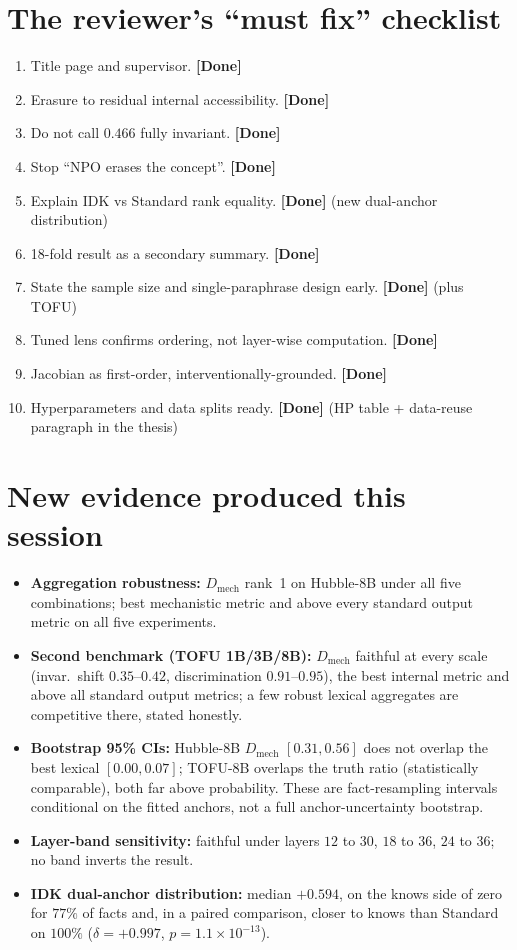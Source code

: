 \documentclass[11pt,a4paper]{article}
\newcommand{\dmech}{\ensuremath{D_{\text{mech}}}}
\newcommand{\done}{\textbf{\textcolor{black!80}{[Done]}}}
\begin{document}
\section{The reviewer's ``must fix'' checklist}
\begin{enumerate}[label=\arabic*.]
\item Title page and supervisor. \done{}
\item Erasure to residual internal accessibility. \done{}
\item Do not call $0.466$ fully invariant. \done{}
\item Stop ``NPO erases the concept''. \done{}
\item Explain IDK vs Standard rank equality. \done{} (new dual-anchor distribution)
\item 18-fold result as a secondary summary. \done{}
\item State the sample size and single-paraphrase design early. \done{} (plus TOFU)
\item Tuned lens confirms ordering, not layer-wise computation. \done{}
\item Jacobian as first-order, interventionally-grounded. \done{}
\item Hyperparameters and data splits ready. \done{} (HP table + data-reuse paragraph in the thesis)
\end{enumerate}

\section{New evidence produced this session}
\begin{itemize}
\item \textbf{Aggregation robustness:} \dmech{} rank~1 on Hubble-8B under all five combinations; best
mechanistic metric and above every standard output metric on all five experiments.
\item \textbf{Second benchmark (TOFU 1B/3B/8B):} \dmech{} faithful at every scale (invar.\ shift
$0.35$--$0.42$, discrimination $0.91$--$0.95$), the best internal metric and above all standard output
metrics; a few robust lexical aggregates are competitive there, stated honestly.
\item \textbf{Bootstrap 95\% CIs:} Hubble-8B \dmech{} $[0.31,0.56]$ does not overlap the best lexical
$[0.00,0.07]$; TOFU-8B overlaps the truth ratio (statistically comparable), both far above probability.
These are fact-resampling intervals conditional on the fitted anchors, not a full anchor-uncertainty
bootstrap.
\item \textbf{Layer-band sensitivity:} faithful under layers $12$ to $30$, $18$ to $36$, $24$ to $36$; no
band inverts the result.
\item \textbf{IDK dual-anchor distribution:} median $+0.594$, on the knows side of zero for $77\%$ of facts
and, in a paired comparison, closer to knows than Standard on $100\%$ ($\delta=+0.997$,
$p=1.1\times10^{-13}$).
\end{itemize}
\end{document}

